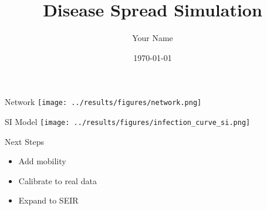 \documentclass{beamer}
\title{Disease Spread Simulation}
\author{Your Name}
\date{\today}
\begin{document}
\frame{\titlepage}
\begin{frame}{Network}
\texttt{[image: ../results/figures/network.png]}
\end{frame}
\begin{frame}{SI Model}
\texttt{[image: ../results/figures/infection\_curve\_si.png]}
\end{frame}
\begin{frame}{Next Steps}
\begin{itemize}
  \item Add mobility
  \item Calibrate to real data
  \item Expand to SEIR
\end{itemize}
\end{frame}
\end{document}
